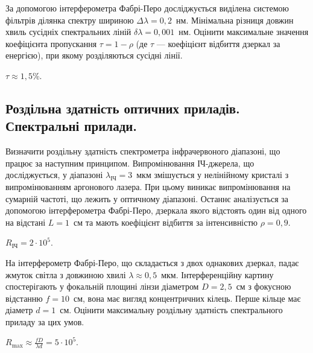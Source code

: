 \begin{problem}%
    За допомогою інтерферометра Фабрі-Перо досліджується виділена системою фільтрів ділянка спектру шириною $ \Delta\lambda = 0,2 $~нм. Мінімальна різниця довжин хвиль сусідніх спектральних ліній $ \delta\lambda = 0,001 $~нм. Оцінити максимальне значення коефіцієнта пропускання $\tau = 1- \rho$ (де $\tau$ --- коефіцієнт відбиття дзеркал за енергією), при якому розділяються сусідні лінії.
    \begin{solution}
        $\tau \approx 1,5$\%.
    \end{solution}
\end{problem}






\subsection*{Роздільна здатність оптичних приладів. Спектральні прилади.
}


\begin{problem}%
    Визначити роздільну здатність спектрометра інфрачервоного діапазоні, що працює за наступним принципом. Випромінювання ІЧ-джерела, що досліджується, у діапазоні $ \lambda_\text{ІЧ} = 3$~мкм змішується у нелінійному кристалі з випромінюванням аргонового лазера. При цьому виникає випромінювання на сумарній частоті, що лежить у оптичному діапазоні. Останнє аналізується за допомогою інтерферометра Фабрі-Перо, дзеркала якого відстоять один від одного на відстані $ L = 1 $~см та мають коефіцієнт відбиття за інтенсивністю $ \rho = 0,9  $.
    \begin{solution}
        $R_\text{ІЧ} = 2\cdot10^5$.
    \end{solution}
\end{problem}


\begin{problem}%
    На інтерферометр Фабрі-Перо, що складається з двох однакових
    дзеркал, падає жмуток світла з довжиною хвилі $ \lambda \approx  0,5 $~мкм.
    Інтерференційну картину спостерігають у фокальній площині лінзи
    діаметром $ D = 2,5 $~см з фокусною відстанню $ f = 10 $~см, вона має вигляд
    концентричних кілець. Перше кільце має діаметр $ d = 1 $~см. Оцінити
    максимальну роздільну здатність спектрального приладу за цих умов.
    \begin{solution}
        $R_{\max} \approx \frac{fD}{\lambda d} = 5\cdot10^5$.
    \end{solution}
\end{problem}


